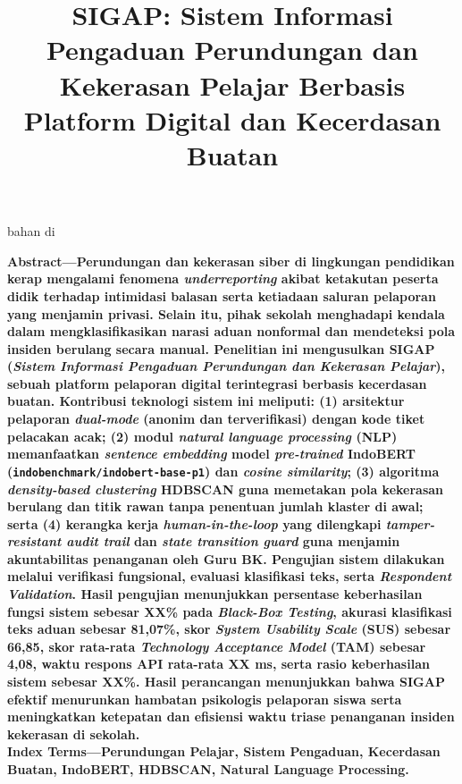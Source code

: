 bahan di\documentclass[conference]{IEEEtran}
\begin{document}
\clearpage
\twocolumn

\title{SIGAP: Sistem Informasi Pengaduan Perundungan dan Kekerasan Pelajar Berbasis Platform Digital dan Kecerdasan Buatan}

\author{
}

\maketitle

\noindent\textbf{Abstract---}\textbf{Perundungan dan kekerasan siber di lingkungan pendidikan kerap mengalami fenomena \textit{underreporting} akibat ketakutan peserta didik terhadap intimidasi balasan serta ketiadaan saluran pelaporan yang menjamin privasi. Selain itu, pihak sekolah menghadapi kendala dalam mengklasifikasikan narasi aduan nonformal dan mendeteksi pola insiden berulang secara manual. Penelitian ini mengusulkan SIGAP (\textit{Sistem Informasi Pengaduan Perundungan dan Kekerasan Pelajar}), sebuah platform pelaporan digital terintegrasi berbasis kecerdasan buatan. Kontribusi teknologi sistem ini meliputi: (1) arsitektur pelaporan \textit{dual-mode} (anonim dan terverifikasi) dengan kode tiket pelacakan acak; (2) modul \textit{natural language processing} (NLP) memanfaatkan \textit{sentence embedding} model \textit{pre-trained} IndoBERT (\texttt{indobenchmark/indobert-base-p1}) dan \textit{cosine similarity}; (3) algoritma \textit{density-based clustering} HDBSCAN guna memetakan pola kekerasan berulang dan titik rawan tanpa penentuan jumlah klaster di awal; serta (4) kerangka kerja \textit{human-in-the-loop} yang dilengkapi \textit{tamper-resistant audit trail} dan \textit{state transition guard} guna menjamin akuntabilitas penanganan oleh Guru BK. Pengujian sistem dilakukan melalui verifikasi fungsional, evaluasi klasifikasi teks, serta \textit{Respondent Validation}. Hasil pengujian menunjukkan persentase keberhasilan fungsi sistem sebesar XX\% pada \textit{Black-Box Testing}, akurasi klasifikasi teks aduan sebesar 81,07\%, skor \textit{System Usability Scale} (SUS) sebesar 66,85, skor rata-rata \textit{Technology Acceptance Model} (TAM) sebesar 4,08, waktu respons API rata-rata XX ms, serta rasio keberhasilan sistem sebesar XX\%. Hasil perancangan menunjukkan bahwa SIGAP efektif menurunkan hambatan psikologis pelaporan siswa serta meningkatkan ketepatan dan efisiensi waktu triase penanganan insiden kekerasan di sekolah.}\\
\textbf{Index Terms---Perundungan Pelajar, Sistem Pengaduan, Kecerdasan Buatan, IndoBERT, HDBSCAN, Natural Language Processing.}
\end{document}

